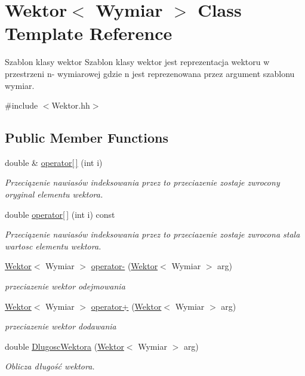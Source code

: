\hypertarget{classWektor}{}\section{Wektor$<$ Wymiar $>$ Class Template Reference}
\label{classWektor}


Szablon klasy wektor Szablon klasy wektor jest reprezentacja wektoru w przestrzeni n-\/ wymiarowej gdzie n jest reprezenowana przez argument szablonu wymiar.  




{\ttfamily \#include $<$Wektor.\+hh$>$}

\subsection*{Public Member Functions}
\begin{DoxyCompactItemize}
\item 
double \& \hyperlink{classWektor_a2dc8e9f75d86af3858121c5a99d0def5}{operator\mbox{[}$\,$\mbox{]}} (int i)
\begin{DoxyCompactList}\small\item\em Przeciązenie nawiasów indeksowania przez to przeciazenie zostaje zwrocony oryginal elementu wektora. \end{DoxyCompactList}\item 
double \hyperlink{classWektor_a3db64cabd91749fd305e9c875804abda}{operator\mbox{[}$\,$\mbox{]}} (int i) const
\begin{DoxyCompactList}\small\item\em Przeciązenie nawiasów indeksowania przez to przeciazenie zostaje zwrocona stala wartosc elementu wektora. \end{DoxyCompactList}\item 
\hyperlink{classWektor}{Wektor}$<$ Wymiar $>$ \hyperlink{classWektor_a36c8df810f47db5b99a57654530c8171}{operator-\/} (\hyperlink{classWektor}{Wektor}$<$ Wymiar $>$ arg)
\begin{DoxyCompactList}\small\item\em przeciazenie wektor odejmowania \end{DoxyCompactList}\item 
\hyperlink{classWektor}{Wektor}$<$ Wymiar $>$ \hyperlink{classWektor_a207e99f62caf9dd33439bc50545a9c23}{operator+} (\hyperlink{classWektor}{Wektor}$<$ Wymiar $>$ arg)
\begin{DoxyCompactList}\small\item\em przeciazenie wektor dodawania \end{DoxyCompactList}\item 
double \hyperlink{classWektor_a74d55a6b59308fe4501e0159cf2dbc17}{Dlugosc\+Wektora} (\hyperlink{classWektor}{Wektor}$<$ Wymiar $>$ arg)
\begin{DoxyCompactList}\small\item\em Oblicza długość wektora. \end{DoxyCompactList}\end{DoxyCompactItemize}


